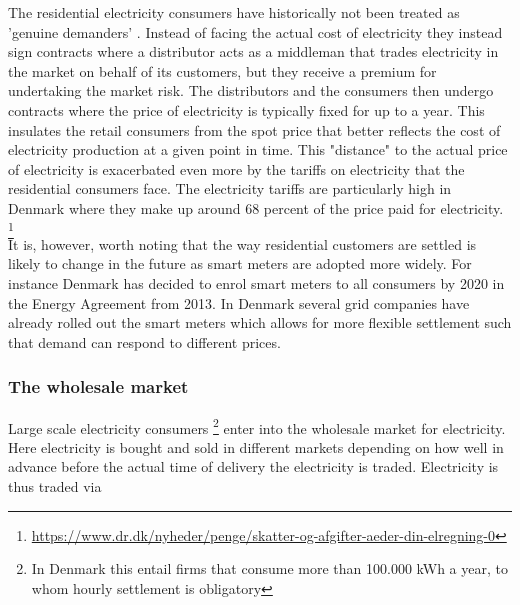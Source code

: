 The residential electricity consumers have historically not been treated as 'genuine demanders' \citep{kirschen2003demand}. Instead of facing the actual cost of electricity they instead sign contracts where a distributor acts as a middleman that trades electricity in the market on behalf of its customers, but they receive a premium for undertaking the market risk. The distributors and the consumers then undergo contracts where the price of electricity is typically fixed for up to a year. This insulates the retail consumers from the spot price that better reflects the cost of electricity production at a given point in time. This "distance" to the actual price of electricity is exacerbated even more by the tariffs on electricity that the residential consumers face. The electricity tariffs are particularly high in Denmark where they make up around 68 percent of the price paid for electricity. \footnote{\url{https://www.dr.dk/nyheder/penge/skatter-og-afgifter-aeder-din-elregning-0}} \smallskip \\

It is, however, worth noting that the way residential customers are settled is likely to change in the future as smart meters are adopted more widely. For instance Denmark has decided to enrol smart meters to all consumers by 2020 in the Energy Agreement from 2013. In Denmark several grid companies have already rolled out the smart meters which allows for more flexible settlement such that demand can respond to different prices.

\subsubsection{The wholesale market}
\label{subsubsec: t_whomarket}
Large scale electricity consumers \footnote{In Denmark this entail firms that consume more than 100.000 kWh  a year, to whom hourly settlement is obligatory} enter into the wholesale market for electricity. Here electricity is bought and sold in different markets depending on how well in advance before the actual time of delivery the electricity is traded. Electricity is thus traded via

